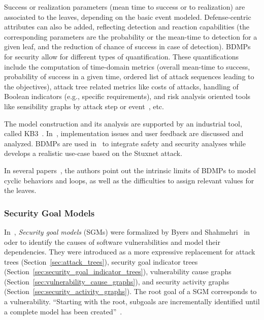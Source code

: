 \documentclass[a4paper]{article}
\begin{document}
Success or realization parameters (mean time to success or to realization) are
associated to the leaves, depending on the basic event modeled. Defense-centric
attributes can also be added, reflecting detection and reaction capabilities
(the corresponding parameters are the probability or the mean-time to detection
for a given leaf, and the reduction of chance of success in case of detection). 
BDMPs for security allow for different types of quantification. These
quantifications include the computation of time-domain metrics (overall
mean-time to success, probability of success in a given time, ordered list of
attack sequences leading to the objectives), attack tree related metrics like
costs of attacks, handling of Boolean indicators (e.g., specific requirements),
and risk analysis oriented tools  like sensibility graphs by attack step or
event~\cite{PiDeBo}, etc.

The model construction and its analysis are supported by an industrial tool,
called KB3~\cite{KB3}. In~\cite{PiDeBo}, implementation issues and user feedback
are discussed and analyzed. BDMPs are used in~\cite{PiBo5,John} to integrate
safety and security analyses while~\cite{KriBoPi} develops a realistic use-case
based on the Stuxnet attack.

In several papers~\cite{PiBo6,PiBo2,PiDeBo}, the authors point out the intrinsic
limits of BDMPs to model cyclic behaviors and loops, as well as the difficulties
to assign relevant values for the leaves.

\subsubsection{Security Goal Models} 
\label{sec:security_goal_models}

In~, \emph{Security goal models} (SGMs) were formalized by Byers and
Shahmehri~\cite{BySh} in oder to identify the causes of software 
vulnerabilities and model their dependencies. They were introduced as a more
expressive replacement for attack trees (Section~\ref{sec:attack_trees}),
security goal indicator trees (Section~\ref{sec:security_goal_indicator_trees}),
vulnerability cause graphs (Section~\ref{sec:vulnerability_cause_graphs}), and
security activity graphs (Section~\ref{sec:security_activity_graphs}). The root
goal of a SGM corresponds to a vulnerability. ``Starting with the root, subgoals
are incrementally identified until a complete model has been
created''~\cite{ShMaOcByCaArJi}.
\end{document}
